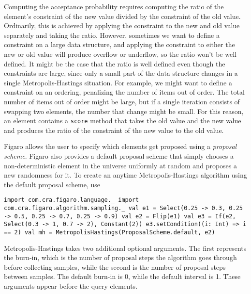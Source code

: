 Computing the acceptance probability requires computing the ratio of the element's constraint of the new value divided by the constraint of the old value. Ordinarily, this is achieved by applying the
constraint to the new and old value separately and taking the ratio. However, sometimes we want to define a constraint on a large data structure, and applying the constraint to either the new or old value will produce overflow or underflow, so the ratio won't be well defined. It might be the case that the ratio is well defined even though the constraints are large, since only a small part of the data structure changes in a single Metropolis-Hastings situation. For example, we might want to define a constraint on an ordering, penalizing the number of items out of order. The total number of items out of order might be large, but if a single iteration consists of swapping two elements, the number that change might be small. For this reason, an element contains a \texttt{score} method that takes the old value and the new value and produces the ratio of the constraint of the new value to the old value.

Figaro allows the user to specify which elements get proposed using a \emph{proposal scheme}. Figaro also provides a default proposal scheme that simply chooses a non-deterministic element in the universe uniformly at random and proposes a new randomness for it. To create an anytime Metropolis-Hastings algorithm using the default proposal scheme, use

\begin{flushleft}
\texttt{import com.cra.figaro.language.\_
\newline import com.cra.figaro.algorithm.sampling.\_
\newline 
\newline val e1 = Select(0.25 -> 0.3, 0.25 -> 0.5, 0.25 -> 0.7, 0.25 -> 0.9)
\newline val e2 = Flip(e1)
\newline val e3 = If(e2, Select(0.3 -> 1, 0.7 -> 2), Constant(2))
\newline e3.setCondition((i: Int) => i == 2)
\newline 
\newline val mh = MetropolisHastings(ProposalScheme.default, e2)
}
\end{flushleft}

Metropolis-Hastings takes two additional optional arguments. The first represents the burn-in, which is the number of proposal steps the algorithm goes through before collecting samples, while the second is the number of proposal steps between samples. The default burn-in is 0, while the default interval is 1. These arguments appear before the query elements.

